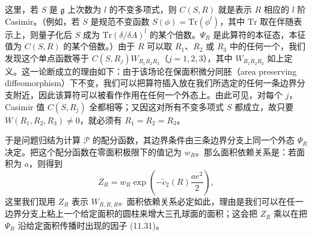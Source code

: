 这里，若 $S$ 是 $\mathfrak{g}$ 上次数为 $l$ 的不变多项式，则 $C(S,R)$ 就是表示 $R$ 相应的 $l$ 阶 Casimir。（例如，若 $S$ 是规范不变函数 $S(\phi)=\mathrm{Tr}(\phi^{l})$，其中 $\mathrm{Tr}$ 取在伴随表示上，则量子化后 $S$ 成为 $\mathrm{Tr}(\delta/\delta A)^{l}$ 的某个倍数。$\Psi_R$ 是此算符的本征态，本征值为 $C(S,R)$ 的某个倍数。）由于 $R$ 可以取 $R_1$、$R_2$ 或 $R_3$ 中的任何一个，我们发现这个单点函数等于 $C(S,R_j)W_{R_1R_2R_3}$（$j=1,2,3$），其中 $W_{R_1R_2R_3}$ 如上定义。这一论断成立的理由如下：由于该场论在保面积微分同胚（area preserving diffeomorphism）下不变，我们可以把算符插入放在我们所选定的任何一条边界分支附近，因此该算符可以被看作作用在任何一个外态上。由此可见，对每个 $j$，Casimir 值 $C(S,R_j)$ 全都相等；又因这对所有不变多项式 $S$ 都成立，故只要 $W(R_1,R_2,R_3)\neq0$，就必须有 $R_1=R_2=R_3$。


于是问题归结为计算 $\mathcal{P}$ 的配分函数，其边界条件由三条边界分支上同一个外态 $\Psi_R$ 决定。把这个配分函数在零面积极限下的值记为 $w_R$。那么面积依赖关系是：若面积为 $a$，则得到
\begin{equation}
  \tag{11.35}
  \label{eq:11-35}
  Z_R=w_R\exp\left(-\tilde{c}_2(R)\frac{ae^{2}}{2}\right),
\end{equation}
这里我们现用 $Z_R$ 表示 $W_{R,R,R}$。面积依赖关系必定如此，理由是我们可以在任一边界分支上粘上一个给定面积的圆柱来增大三孔球面的面积；这会把 $Z_R$ 乘以在把 $\Psi_R$ 沿给定面积传播时出现的因子 (11.31)。



